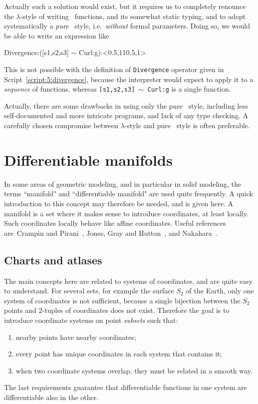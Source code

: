 \documentclass{31x47jw}
\begin{document}
\begin{example}
Actually such a solution would exist, but it requires us to completely
renounce the $\lambda$-style of writing \pl\ functions, and its
somewhat static typing, and to adopt systematically a \emph{pure} \fl\ 
style, i.e.~\emph{without} formal parameters. 
Doing so, we would be able to write an expression like
\begin{smallplasm} 
Divergence:([s1,s2,s3] $\sim$ Curl:g):<0.5,110.5,1>
\end{smallplasm} 
This is not possible with the definition of \texttt{Divergence}
operator given in Script~\ref{script:5:divergence}, because the
interpreter would expect to apply it to a \emph{sequence} of functions,
whereas \texttt{[s1,s2,s3] $\sim$ Curl:g} is a single function.

Actually, there are some drawbacks in using only the pure \fl\ style,
including less self-documented and more intricate programs, and lack
of any type checking.  A carefully chosen compromise between
$\lambda$-style and pure \fl\ style is often preferable.

\label{example:5:checks}
\end{example}



\section{Differentiable manifolds}

In some areas of geometric modeling, and in particular in solid
modeling, the terms ``manifold" and ``differentiable manifold" are
used quite frequently.  A quick introduction to this concept may
therefore be needed, and is given here.  A manifold is a set where it 
makes sense to introduce coordinates, at least locally. Such 
coordinates locally behave like affine coordinates.
Useful references are~Crampin
and Pirani~\cite{crampin:86}, Jones, Gray and Hutton~\cite{jones:87},
and Nakahara~\cite{nakahara:90}.


\subsection{Charts and atlases}

The main concepts here are related to systems of coordinates, and are
quite easy to understand.  For several sets, for example the surface
$S_{2}$ of the Earth, only one system of coordinates is not
sufficient, because a single bijection between the $S_{2}$ points and
$2$-tuples of coordinates does not exist.  Therefore the goal is 
to introduce coordinate systems on point \emph{subsets} such that:
\begin{enumerate}
    \item
    nearby points have nearby coordinates; 
    \item
    every point has unique coordinates in each system that contains
    it;
    \item
    when two coordinate systems overlap, they must be related in a
    smooth way.
\end{enumerate}
The last requirements guarantee that differentiable functions in one
system are differentiable also in the other.
\end{document}
